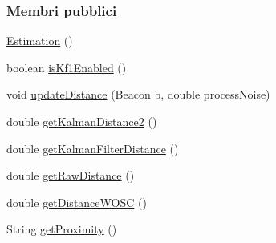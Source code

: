 \subsubsection*{Membri pubblici}
\begin{DoxyCompactItemize}
\item 
\hyperlink{classit_1_1unibo_1_1torsello_1_1bluetoothpositioning_1_1distanceEstimation_1_1Estimation_abd84ded1e26d40304606ce0572735106_abd84ded1e26d40304606ce0572735106}{Estimation} ()
\item 
boolean \hyperlink{classit_1_1unibo_1_1torsello_1_1bluetoothpositioning_1_1distanceEstimation_1_1Estimation_a50dcba2a259a12247c634f0285fe6fba_a50dcba2a259a12247c634f0285fe6fba}{is\+Kf1\+Enabled} ()
\item 
void \hyperlink{classit_1_1unibo_1_1torsello_1_1bluetoothpositioning_1_1distanceEstimation_1_1Estimation_aaf86439861db7facf3f5338ec2fc6cde_aaf86439861db7facf3f5338ec2fc6cde}{update\+Distance} (Beacon b, double process\+Noise)
\item 
double \hyperlink{classit_1_1unibo_1_1torsello_1_1bluetoothpositioning_1_1distanceEstimation_1_1Estimation_a4a4511ce7469879058de082403bd9847_a4a4511ce7469879058de082403bd9847}{get\+Kalman\+Distance2} ()
\item 
double \hyperlink{classit_1_1unibo_1_1torsello_1_1bluetoothpositioning_1_1distanceEstimation_1_1Estimation_a985e9b8b61c3d1e917a2e818b5f8b679_a985e9b8b61c3d1e917a2e818b5f8b679}{get\+Kalman\+Filter\+Distance} ()
\item 
double \hyperlink{classit_1_1unibo_1_1torsello_1_1bluetoothpositioning_1_1distanceEstimation_1_1Estimation_ad355b2e850a8d6013ef771eecd740e1b_ad355b2e850a8d6013ef771eecd740e1b}{get\+Raw\+Distance} ()
\item 
double \hyperlink{classit_1_1unibo_1_1torsello_1_1bluetoothpositioning_1_1distanceEstimation_1_1Estimation_a5c7bce21cd77c98a8d1e6df4c930397c_a5c7bce21cd77c98a8d1e6df4c930397c}{get\+Distance\+W\+O\+SC} ()
\item 
String \hyperlink{classit_1_1unibo_1_1torsello_1_1bluetoothpositioning_1_1distanceEstimation_1_1Estimation_a2edfb9f301730647277474c61b41dbd5_a2edfb9f301730647277474c61b41dbd5}{get\+Proximity} ()
\end{DoxyCompactItemize}
